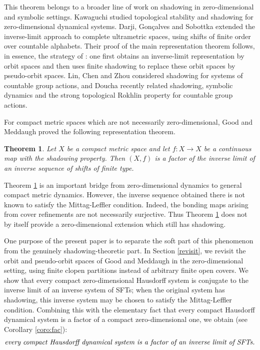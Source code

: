 \documentclass[12pt]{amsart}
\newtheorem{theorem}{Theorem}[section]
\theoremstyle{definition}
\numberwithin{equation}{section}
\theoremstyle{remark}
\begin{document}
This theorem belongs to a broader line of work on shadowing in
zero-dimensional and symbolic settings. Kawaguchi \cite{Kaw} studied
topological stability and shadowing for zero-dimensional dynamical systems.
Darji, Gon\c{c}alves and Sobottka \cite{Darji} extended the inverse-limit
approach to complete ultrametric spaces, using shifts of finite order over
countable alphabets. Their proof of the main representation theorem follows,
in essence, the strategy of \cite[Theorem~18]{GM}: one first obtains an
inverse-limit representation by orbit spaces and then uses finite shadowing
to replace these orbit spaces by pseudo-orbit spaces. Lin, Chen and Zhou
\cite{LCZ} considered shadowing for systems of countable group actions, and
Doucha \cite{Dou} recently related shadowing, symbolic dynamics and the strong
topological Rokhlin property for countable group actions.


For compact metric spaces which are not necessarily zero-dimensional, Good and
Meddaugh proved the following representation theorem.

\begin{theorem}\cite[Theorem 20]{GM}\label{thm:GM20}
Let $X$ be a compact metric space and let $f:X\to X$ be a continuous map with
the shadowing property. Then $(X,f)$ is a factor of the inverse limit of an
inverse sequence of shifts of finite type.
\end{theorem}

Theorem \ref{thm:GM20} is an important bridge from zero-dimensional dynamics to
general compact metric dynamics. However, the inverse sequence obtained there is
not known to satisfy the Mittag-Leffler condition. Indeed, the bonding maps
arising from cover refinements are not necessarily surjective. Thus
Theorem \ref{thm:GM20} does not by itself provide a zero-dimensional extension
which still has shadowing.

One purpose of the present paper is to separate the soft part of this phenomenon
from the genuinely shadowing-theoretic part. In Section \ref{revisit}, we revisit the orbit
and pseudo-orbit spaces of Good and Meddaugh in the zero-dimensional setting,
using finite clopen partitions instead of arbitrary finite open covers. We show
that every compact zero-dimensional Hausdorff system is conjugate to the inverse
limit of an inverse system of SFTs; when the original system has shadowing, this
inverse system may be chosen to satisfy the Mittag-Leffler condition. Combining
this with the elementary fact that every compact Hausdorff dynamical system is a
factor of a compact zero-dimensional one, we obtain (see Corollary \ref{coro:fac}):
\[
\text{\emph{every compact Hausdorff dynamical system is a factor of an inverse limit
of SFTs.}}
\]
\end{document}
